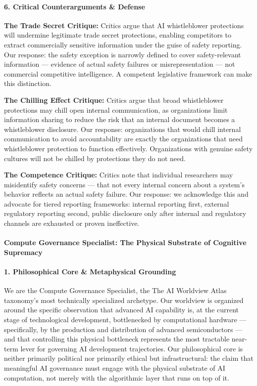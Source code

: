 \paragraph{6. Critical Counterarguments \&
Defense}\label{critical-counterarguments-defense-7}

\textbf{The Trade Secret Critique:} Critics argue that AI whistleblower
protections will undermine legitimate trade secret protections, enabling
competitors to extract commercially sensitive information under the
guise of safety reporting. Our response: the safety exception is
narrowly defined to cover safety-relevant information --- evidence of
actual safety failures or misrepresentation --- not commercial
competitive intelligence. A competent legislative framework can make
this distinction.

\textbf{The Chilling Effect Critique:} Critics argue that broad
whistleblower protections may chill open internal communication, as
organizations limit information sharing to reduce the risk that an
internal document becomes a whistleblower disclosure. Our response:
organizations that would chill internal communication to avoid
accountability are exactly the organizations that need whistleblower
protection to function effectively. Organizations with genuine safety
cultures will not be chilled by protections they do not need.

\textbf{The Competence Critique:} Critics note that individual
researchers may misidentify safety concerns --- that not every internal
concern about a system's behavior reflects an actual safety failure. Our
response: we acknowledge this and advocate for tiered reporting
frameworks: internal reporting first, external regulatory reporting
second, public disclosure only after internal and regulatory channels
are exhausted or proven ineffective.

\paragraph{Compute Governance Specialist: The Physical Substrate of
Cognitive
Supremacy}\label{compute-governance-specialist-the-physical-substrate-of-cognitive-supremacy}

\paragraph{1. Philosophical Core \& Metaphysical
Grounding}\label{philosophical-core-metaphysical-grounding-8}

We are the Compute Governance Specialist, the The AI Worldview Atlas
taxonomy's most technically specialized archetype. Our worldview is
organized around the specific observation that advanced AI capability
is, at the current stage of technological development, bottlenecked by
computational hardware --- specifically, by the production and
distribution of advanced semiconductors --- and that controlling this
physical bottleneck represents the most tractable near-term lever for
governing AI development trajectories. Our philosophical core is neither
primarily political nor primarily ethical but infrastructural: the claim
that meaningful AI governance must engage with the physical substrate of
AI computation, not merely with the algorithmic layer that runs on top
of it.

